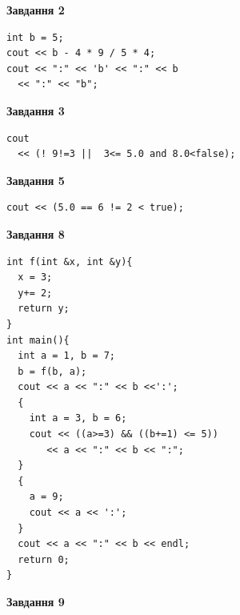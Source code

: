 \documentclass[12pt, ukrainian]{article}
\begin{document}
{\begin {large}
\begin{minipage}[t]{7.0cm}
\end{minipage}
\vline \hspace{1mm}
\begin{minipage}[t]{11.0cm}

\begin{center}
\textbf{Завдання 2}
\end{center}
\vspace{-8mm}

\begin{verbatim}
int b = 5;
cout << b - 4 * 9 / 5 * 4;
cout << ":" << 'b' << ":" << b 
  << ":" << "b";
\end{verbatim}



\begin{center}
\textbf{Завдання 3}
\end{center}
\vspace{-8mm}

\begin{verbatim}
cout 
  << (! 9!=3 ||  3<= 5.0 and 8.0<false);
\end{verbatim}



\begin{center}
\textbf{Завдання 5}
\end{center}
\vspace{-8mm}

\begin{verbatim}
cout << (5.0 == 6 != 2 < true);
\end{verbatim}



\begin{center}
\textbf{Завдання 8}
\end{center}
\vspace{-8mm}

\begin{verbatim}
int f(int &x, int &y){
  x = 3;
  y+= 2;
  return y;
}
int main(){
  int a = 1, b = 7;
  b = f(b, a);
  cout << a << ":" << b <<':';
  {
    int a = 3, b = 6;
    cout << ((a>=3) && ((b+=1) <= 5))
       << a << ":" << b << ":";
  }
  {
    a = 9;
    cout << a << ':';
  }
  cout << a << ":" << b << endl;
  return 0;
}
\end{verbatim}

\end{minipage}


\begin{minipage}[t]{7.0cm}

\begin{center}
\textbf{Завдання 9}
\end{center}
\vspace{-8mm}


\end{minipage}
\end{large}}
\end{document}
